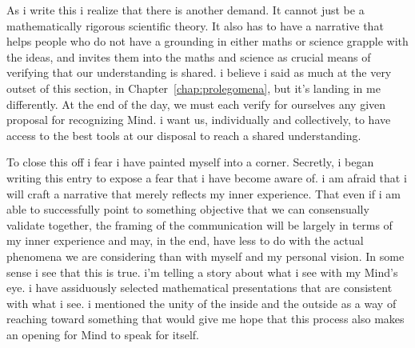 As i write this i realize that there is another demand. It cannot just be a mathematically rigorous scientific theory. It also has to have a narrative that helps people who do not have a grounding in either maths or science grapple with the ideas, and invites them into the maths and science as crucial means of verifying that our understanding is shared. i believe i said as much at the very outset of this section, in Chapter~\ref{chap:prolegomena}, but it's landing in me differently. At the end of the day, we must each verify for ourselves any given proposal for recognizing Mind. i want us, individually and collectively, to have access to the best tools at our disposal to reach a shared understanding.

To close this off i fear i have painted myself into a corner. Secretly, i began writing this entry to expose a fear that i have become aware of. i am afraid that i will craft a narrative that merely reflects my inner experience. That even if i am able to successfully point to something objective that we can consensually validate together, the framing of the communication will be largely in terms of my inner experience and may, in the end, have less to do with the actual phenomena we are considering than with myself and my personal vision. In some sense i see that this is true. i'm telling a story about what i see with my Mind's eye. i have assiduously selected mathematical presentations that are consistent with what i see. i mentioned the unity of the inside and the outside as a way of reaching toward something that would give me hope that this process also makes an opening for Mind to speak for itself.
